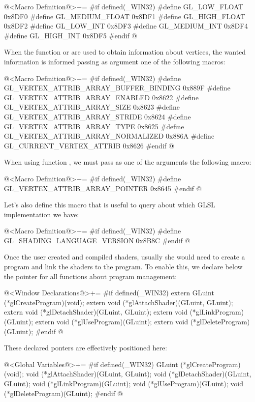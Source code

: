 \iniciocodigo
@<Macro Definition@>+=
#if defined(_WIN32)
#define GL_LOW_FLOAT    0x8DF0
#define GL_MEDIUM_FLOAT 0x8DF1
#define GL_HIGH_FLOAT   0x8DF2
#define GL_LOW_INT      0x8DF3
#define GL_MEDIUM_INT   0x8DF4
#define GL_HIGH_INT     0x8DF5
#endif
@
\fimcodigo

When the function 
or  are used to obtain information
about vertices, the wanted information is informed passing as argument
one of the following macros:

\iniciocodigo
@<Macro Definition@>+=
#if defined(_WIN32)
#define GL_VERTEX_ATTRIB_ARRAY_BUFFER_BINDING 0x889F
#define GL_VERTEX_ATTRIB_ARRAY_ENABLED        0x8622
#define GL_VERTEX_ATTRIB_ARRAY_SIZE           0x8623
#define GL_VERTEX_ATTRIB_ARRAY_STRIDE         0x8624
#define GL_VERTEX_ATTRIB_ARRAY_TYPE           0x8625
#define GL_VERTEX_ATTRIB_ARRAY_NORMALIZED     0x886A
#define GL_CURRENT_VERTEX_ATTRIB              0x8626
#endif
@
\fimcodigo

When using function , we must
pass as one of the arguments the following macro:

\iniciocodigo
@<Macro Definition@>+=
#if defined(_WIN32)
#define GL_VERTEX_ATTRIB_ARRAY_POINTER 0x8645
#endif
@
\fimcodigo

Let's also define this macro that is useful to query about which GLSL
implementation we have:

\iniciocodigo
@<Macro Definition@>+=
#if defined(_WIN32)
#define GL_SHADING_LANGUAGE_VERSION 0x8B8C
#endif
@
\fimcodigo

Once the user created and compiled shaders, usually she would need to
create a program and link the shaders to the program. To enable this,
we declare below the pointer for all functions about program
management:

\iniciocodigo
@<Window Declarations@>+=
#if defined(_WIN32)
extern GLuint (*glCreateProgram)(void);
extern void (*glAttachShader)(GLuint, GLuint);
extern void (*glDetachShader)(GLuint, GLuint);
extern void (*glLinkProgram)(GLuint);
extern void (*glUseProgram)(GLuint);
extern void (*glDeleteProgram)(GLuint);
#endif
@
\fimcodigo

These declared ponters are effectively positioned here:

\iniciocodigo
@<Global Variables@>+=
#if defined(_WIN32)
GLuint (*glCreateProgram)(void);
void (*glAttachShader)(GLuint, GLuint);
void (*glDetachShader)(GLuint, GLuint);
void (*glLinkProgram)(GLuint);
void (*glUseProgram)(GLuint);
void (*glDeleteProgram)(GLuint);
#endif
@
\fimcodigo


